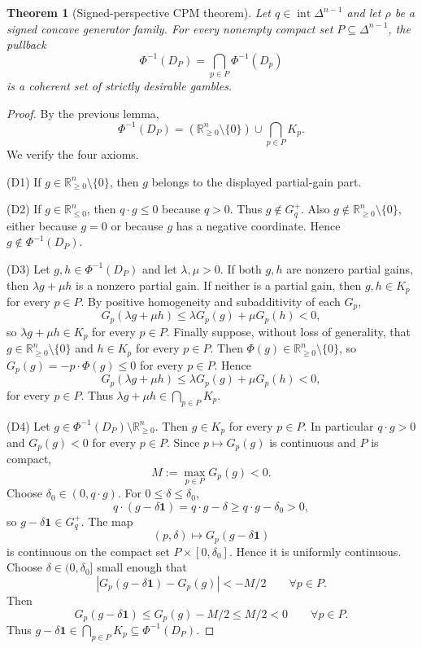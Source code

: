 \documentclass[11pt]{article}
\theoremstyle{plain}
\newtheorem{theorem}{Theorem}[section]
\theoremstyle{definition}
\theoremstyle{remark}
\DeclareMathOperator{\interior}{int}
\newcommand{\R}{\mathbb{R}}
\newcommand{\one}{\mathbf 1}
\newcommand{\DeltaN}{\Delta^{n-1}}
\begin{document}
\begin{theorem}[Signed-perspective CPM theorem]
Let $q\in\interior\DeltaN$ and let $\rho$ be a signed concave generator family. For every nonempty compact set $P\subseteq\DeltaN$, the pullback
\[
\Phi^{-1}(D_P)=\bigcap_{p\in P}\Phi^{-1}(D_p)
\]
is a coherent set of strictly desirable gambles.
\end{theorem}

\begin{proof}
By the previous lemma,
\[
\Phi^{-1}(D_P)
=(\R^n_{\ge0}\setminus\{0\})\cup\bigcap_{p\in P}K_p.
\]
We verify the four axioms.

(D1) If $g\in\R^n_{\ge0}\setminus\{0\}$, then $g$ belongs to the displayed partial-gain part.

(D2) If $g\in\R^n_{\le0}$, then $q\cdot g\le0$ because $q>0$. Thus $g\notin G_q^+$. Also $g\notin\R^n_{\ge0}\setminus\{0\}$, either because $g=0$ or because $g$ has a negative coordinate. Hence $g\notin\Phi^{-1}(D_P)$.

(D3) Let $g,h\in\Phi^{-1}(D_P)$ and let $\lambda,\mu>0$.
If both $g,h$ are nonzero partial gains, then $\lambda g+\mu h$ is a nonzero partial gain. If neither is a partial gain, then $g,h\in K_p$ for every $p\in P$. By positive homogeneity and subadditivity of each $G_p$,
\[
G_p(\lambda g+\mu h)
\le \lambda G_p(g)+\mu G_p(h)<0,
\]
so $\lambda g+\mu h\in K_p$ for every $p\in P$. Finally suppose, without loss of generality, that $g\in\R^n_{\ge0}\setminus\{0\}$ and $h\in K_p$ for every $p\in P$. Then $\Phi(g)\in\R^n_{\ge0}\setminus\{0\}$, so $G_p(g)=-p\cdot\Phi(g)\le0$ for every $p\in P$. Hence
\[
G_p(\lambda g+\mu h)
\le \lambda G_p(g)+\mu G_p(h)<0,
\]
for every $p\in P$. Thus $\lambda g+\mu h\in\bigcap_{p\in P}K_p$.

(D4) Let $g\in\Phi^{-1}(D_P)\setminus\R^n_{\ge0}$. Then $g\in K_p$ for every $p\in P$. In particular $q\cdot g>0$ and $G_p(g)<0$ for every $p\in P$. Since $p\mapsto G_p(g)$ is continuous and $P$ is compact,
\[
M:=\max_{p\in P}G_p(g)<0.
\]
Choose $\delta_0\in(0,q\cdot g)$. For $0\le\delta\le\delta_0$,
\[
q\cdot(g-\delta\one)=q\cdot g-\delta\ge q\cdot g-\delta_0>0,
\]
so $g-\delta\one\in G_q^+$. The map
\[
(p,\delta)\longmapsto G_p(g-\delta\one)
\]
is continuous on the compact set $P\times[0,\delta_0]$. Hence it is uniformly continuous. Choose $\delta\in(0,\delta_0]$ small enough that
\[
\left|G_p(g-\delta\one)-G_p(g)\right|<-M/2
\qquad\forall p\in P.
\]
Then
\[
G_p(g-\delta\one)\le G_p(g)-M/2\le M/2<0
\qquad\forall p\in P.
\]
Thus $g-\delta\one\in\bigcap_{p\in P}K_p\subseteq\Phi^{-1}(D_P)$.
\end{proof}
\end{document}
